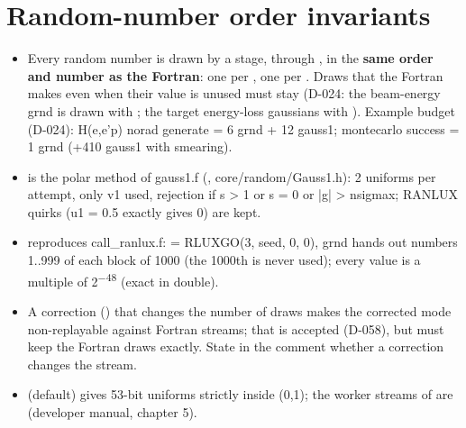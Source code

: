 \section{\texorpdfstring{Random-number order invariants}{Random-number order invariants}}\label{translation_report-04u5fnumerics:46-random-number-order-invariants}
\begin{itemize}
\item Every random number is drawn by a stage, through , in the \textbf{same order and number as the Fortran}: one
 per , one  per . Draws that the Fortran makes even when their value is
unused must stay (D-024: the beam-energy grnd is drawn with ; the target energy-loss gaussians with
). Example budget (D-024): H(e,e'p) norad generate = 6 grnd + 12 gauss1; montecarlo success
= 1 grnd (+410 gauss1 with smearing).
\item {} is the polar method of gauss1.f (, core/\allowbreak{}random/\allowbreak{}Gauss1.h): 2 uniforms per attempt, only v1 used,
rejection if s > 1 or s = 0 or |g| > nsigmax; RANLUX quirks (u1 = 0.5 exactly gives 0) are kept.
\item {} reproduces call\_\allowbreak{}ranlux.\allowbreak{}f:  = RLUXGO(3, seed, 0, 0), grnd hands out numbers 1..999 of each
block of 1000 (the 1000th is never used); every value is a multiple of 2\textsuperscript{−}\textsuperscript{4}\textsuperscript{8} (exact in double).
\item A correction () that changes the number of draws makes the corrected mode non-replayable against
Fortran streams; that is accepted (D-058), but  must keep the Fortran draws exactly. State in the
comment whether a correction changes the stream.
\item {} (default) gives 53-bit uniforms strictly inside (0,1); the worker streams of  are
 (developer manual, chapter 5).
\end{itemize}
